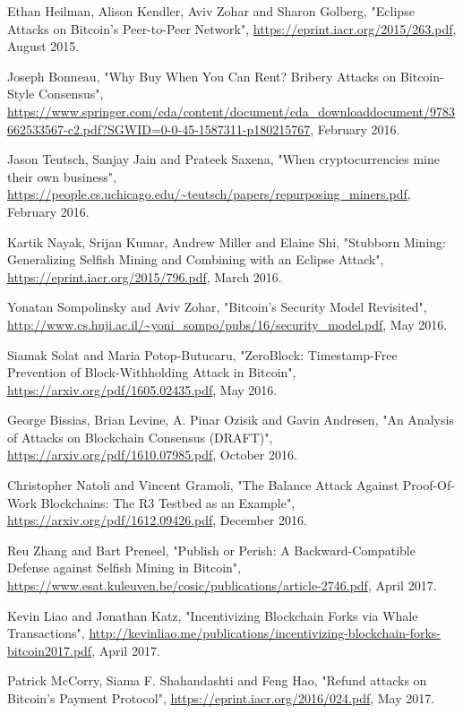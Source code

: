 \documentclass[11pt,a4paper]{article}
\begin{document}
\begin{itemize}
\begin{itemize}
\begin{thebibliography}{9}
Ethan Heilman, Alison Kendler, Aviv Zohar and Sharon Golberg,
"Eclipse Attacks on Bitcoin’s Peer-to-Peer Network",
\url{https://eprint.iacr.org/2015/263.pdf},
August 2015.

Joseph Bonneau,
"Why Buy When You Can Rent? Bribery Attacks on Bitcoin-Style Consensus",
\url{https://www.springer.com/cda/content/document/cda_downloaddocument/9783662533567-c2.pdf?SGWID=0-0-45-1587311-p180215767},
February 2016.

Jason Teutsch, Sanjay Jain and Prateek Saxena,
"When cryptocurrencies mine their own business",
\url{https://people.cs.uchicago.edu/~teutsch/papers/repurposing_miners.pdf},
February 2016.

Kartik Nayak, Srijan Kumar, Andrew Miller and Elaine Shi,
"Stubborn Mining: Generalizing Selfish Mining and Combining with an Eclipse Attack",
\url{https://eprint.iacr.org/2015/796.pdf},
March 2016.

Yonatan Sompolinsky and Aviv Zohar,
"Bitcoin's Security Model Revisited",
\url{http://www.cs.huji.ac.il/~yoni_sompo/pubs/16/security_model.pdf},
May 2016.

Siamak Solat and Maria Potop-Butucaru,
"ZeroBlock: Timestamp-Free Prevention of Block-Withholding Attack in Bitcoin",
\url{https://arxiv.org/pdf/1605.02435.pdf},
May 2016.

George Bissias, Brian Levine, A. Pinar Ozisik and Gavin Andresen,
"An Analysis of Attacks on Blockchain Consensus (DRAFT)",
\url{https://arxiv.org/pdf/1610.07985.pdf},
October 2016.

Christopher Natoli and Vincent Gramoli,
"The Balance Attack Against Proof-Of-Work Blockchains: The R3 Testbed as an Example",
\url{https://arxiv.org/pdf/1612.09426.pdf},
December 2016.

Reu Zhang and Bart Preneel,
"Publish or Perish: A Backward-Compatible Defense against Selfish Mining in Bitcoin",
\url{https://www.esat.kuleuven.be/cosic/publications/article-2746.pdf},
April 2017.

Kevin Liao and Jonathan Katz,
"Incentivizing Blockchain Forks via Whale Transactions",
\url{http://kevinliao.me/publications/incentivizing-blockchain-forks-bitcoin2017.pdf},
April 2017.

Patrick McCorry, Siama F. Shahandashti and Feng Hao,
"Refund attacks on Bitcoin's Payment Protocol",
\url{https://eprint.iacr.org/2016/024.pdf},
May 2017.


\end{thebibliography}
\end{itemize}
\end{itemize}
\end{document}
